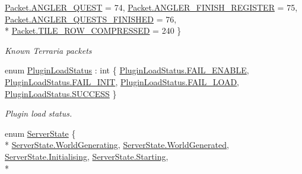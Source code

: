 \begin{DoxyCompactItemize}
\hyperlink{namespace_o_t_a_a77ae6c8a87d7ca2999a6f5a97f90f46da00e4e9f672e8b9bad54b2cbedd89c17c}{Packet.\+A\+N\+G\+L\+E\+R\+\_\+\+Q\+U\+E\+S\+T} = 74, 
\hyperlink{namespace_o_t_a_a77ae6c8a87d7ca2999a6f5a97f90f46da20b2812674fed245fd0fadf16b432bff}{Packet.\+A\+N\+G\+L\+E\+R\+\_\+\+F\+I\+N\+I\+S\+H\+\_\+\+R\+E\+G\+I\+S\+T\+E\+R} = 75, 
\hyperlink{namespace_o_t_a_a77ae6c8a87d7ca2999a6f5a97f90f46da0480892ef8a0ff4ea6e85f9a33cce4bb}{Packet.\+A\+N\+G\+L\+E\+R\+\_\+\+Q\+U\+E\+S\+T\+S\+\_\+\+F\+I\+N\+I\+S\+H\+E\+D} = 76, 
\\*
\hyperlink{namespace_o_t_a_a77ae6c8a87d7ca2999a6f5a97f90f46daf9115059deee79fe5b52bae24bb22e63}{Packet.\+T\+I\+L\+E\+\_\+\+R\+O\+W\+\_\+\+C\+O\+M\+P\+R\+E\+S\+S\+E\+D} = 240
 \}\begin{DoxyCompactList}\small\item\em Known Terraria packets \end{DoxyCompactList}
\item 
enum \hyperlink{namespace_o_t_a_a95dfe163679300500c5eff98fa03349d}{Plugin\+Load\+Status} \+: int \{ \hyperlink{namespace_o_t_a_a95dfe163679300500c5eff98fa03349dac6cc3be9d2dc2d5d88b8a967a1610435}{Plugin\+Load\+Status.\+F\+A\+I\+L\+\_\+\+E\+N\+A\+B\+L\+E}, 
\hyperlink{namespace_o_t_a_a95dfe163679300500c5eff98fa03349dab17ce2ee2def0547f2ac56c522835d14}{Plugin\+Load\+Status.\+F\+A\+I\+L\+\_\+\+I\+N\+I\+T}, 
\hyperlink{namespace_o_t_a_a95dfe163679300500c5eff98fa03349da9bda17ceeddc5ef072f8d78aeb769d56}{Plugin\+Load\+Status.\+F\+A\+I\+L\+\_\+\+L\+O\+A\+D}, 
\hyperlink{namespace_o_t_a_a95dfe163679300500c5eff98fa03349dad0749aaba8b833466dfcbb0428e4f89c}{Plugin\+Load\+Status.\+S\+U\+C\+C\+E\+S\+S}
 \}\begin{DoxyCompactList}\small\item\em Plugin load status. \end{DoxyCompactList}
\item 
enum \hyperlink{namespace_o_t_a_ab97ab16dfa3c2e92e2f3b2342ea84bd0}{Server\+State} \{ \\*
\hyperlink{namespace_o_t_a_ab97ab16dfa3c2e92e2f3b2342ea84bd0a256e42504ece1ebdb7256ff40fe2018c}{Server\+State.\+World\+Generating}, 
\hyperlink{namespace_o_t_a_ab97ab16dfa3c2e92e2f3b2342ea84bd0aac52508fbb03aaca13cb4a1e825f56b1}{Server\+State.\+World\+Generated}, 
\hyperlink{namespace_o_t_a_ab97ab16dfa3c2e92e2f3b2342ea84bd0aa3aec8ad5296270028f3c01db319169d}{Server\+State.\+Initialising}, 
\hyperlink{namespace_o_t_a_ab97ab16dfa3c2e92e2f3b2342ea84bd0ac2efe4bbd13e6cb0db293e72884273c0}{Server\+State.\+Starting}, 
\\*

\end{DoxyCompactItemize}

